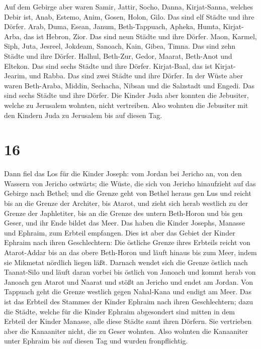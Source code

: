  Auf dem Gebirge aber waren Samir, Jattir, Socho,
 Danna, Kirjat-Sanna, welches Debir ist, 
Anab, Estemo, Anim, Gosen, Holon, Gilo.  Das sind elf
Städte und ihre Dörfer.  Arab, Duma, Esean,
 Janum, Beth-Tappuach, Apheka, Humta, 
Kirjat-Arba, das ist Hebron, Zior. Das sind neun Städte und ihre Dörfer.
 Maon, Karmel, Siph, Juta, Jesreel, 
Jokdeam, Sanoach, Kain, Gibea, Timna.  Das sind zehn
Städte und ihre Dörfer.  Halhul, Beth-Zur, Gedor, Maarat,
Beth-Anot und Eltekon.  Das sind sechs Städte und ihre
Dörfer.  Kirjat-Baal, das ist Kirjat-Jearim, und Rabba.
Das sind zwei Städte und ihre Dörfer.  In der Wüste aber
waren Beth-Araba, Middin,  Sechacha, Nibsan und die
Salzstadt und Engedi. Das sind sechs Städte und ihre Dörfer.
 Die Kinder Juda aber konnten die Jebusiter, welche zu
Jerusalem wohnten, nicht vertreiben. Also wohnten die Jebusiter mit den
Kindern Juda zu Jerusalem bis auf diesen Tag.

\hypertarget{section-15}{%
\section{16}\label{section-15}}

 Dann fiel das Los für die Kinder Joseph: vom Jordan bei
Jericho an, von den Wassern von Jericho ostwärts; die Wüste, die sich
von Jericho hinaufzieht auf das Gebirge nach Bethel;  und
die Grenze geht von Bethel heraus gen Lus und reicht bis an die Grenze
der Architer, bis Atarot,  und zieht sich herab westlich
zu der Grenze der Japhletiter, bis an die Grenze des untern Beth-Horon
und bis gen Geser, und ihr Ende bildet das Meer.  Das
haben die Kinder Josephs, Manasse und Ephraim, zum Erbteil empfangen.
 Dies ist aber das Gebiet der Kinder Ephraim nach ihren
Geschlechtern: Die östliche Grenze ihres Erbteils reicht von
Atarot-Addar bis an das obere Beth-Horon  und läuft hinaus
bis zum Meer, indem sie Mikmetat nördlich liegen läßt. Darnach wendet
sich die Grenze östlich nach Taanat-Silo und läuft daran vorbei bis
östlich von Janoach  und kommt herab von Janoach gen
Atarot und Naarat und stößt an Jericho und endet am Jordan.
 Von Tappuach geht die Grenze westlich gegen Nahal-Kana
und endigt am Meer. Das ist das Erbteil des Stammes der Kinder Ephraim
nach ihren Geschlechtern;  dazu die Städte, welche für die
Kinder Ephraim abgesondert sind mitten in dem Erbteil der Kinder
Manasse, alle diese Städte samt ihren Dörfern.  Sie
vertrieben aber die Kanaaniter nicht, die zu Geser wohnten. Also wohnten
die Kanaaniter unter Ephraim bis auf diesen Tag und wurden
fronpflichtig.


